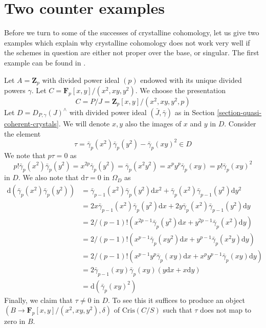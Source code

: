 \section{Two counter examples}
\label{section-examples}

\noindent
Before we turn to some of the successes of crystalline cohomology,
let us give two examples which explain why crystalline cohomology
does not work very well if the schemes in question are either not
proper over the base, or singular. The first example can be found
in \cite{BO}.

\begin{example}
\label{example-torsion}
Let $A = \mathbf{Z}_p$ with divided power ideal $(p)$ endowed with
its unique divided powers $\gamma$. Let
$C = \mathbf{F}_p[x, y]/(x^2, xy, y^2)$. We choose the presentation
$$
C = P/J = \mathbf{Z}_p[x, y]/(x^2, xy, y^2, p)
$$
Let $D = D_{P, \gamma}(J)^\wedge$ with divided power ideal
$(\bar J, \bar \gamma)$ as in Section \ref{section-quasi-coherent-crystals}.
We will denote $x, y$ also the images of $x$ and $y$ in $D$.
Consider the element
$$
\tau = \bar\gamma_p(x^2)\bar\gamma_p(y^2) - \bar\gamma_p(xy)^2 \in D
$$
We note that $p\tau = 0$ as
$$
p! \bar\gamma_p(x^2) \bar\gamma_p(y^2) =
x^{2p} \bar\gamma_p(y^2) = \bar\gamma_p(x^2y^2) =
x^py^p \bar\gamma_p(xy) = p! \bar\gamma_p(xy)^2
$$
in $D$. We also note that $\text{d}\tau = 0$ in $\Omega_D$ as
\begin{align*}
\text{d}(\bar\gamma_p(x^2) \bar\gamma_p(y^2))
& =
\bar\gamma_{p - 1}(x^2)\bar\gamma_p(y^2)\text{d}x^2 +
\bar\gamma_p(x^2)\bar\gamma_{p - 1}(y^2)\text{d}y^2 \\
& =
2 x \bar\gamma_{p - 1}(x^2)\bar\gamma_p(y^2)\text{d}x +
2 y \bar\gamma_p(x^2)\bar\gamma_{p - 1}(y^2)\text{d}y \\
& =
2/(p - 1)!( x^{2p - 1} \bar\gamma_p(y^2)\text{d}x +
y^{2p - 1} \bar\gamma_p(x^2)\text{d}y ) \\
& =
2/(p - 1)!
(x^{p - 1} \bar\gamma_p(xy^2)\text{d}x +
y^{p - 1} \bar\gamma_p(x^2y)\text{d}y) \\
& =
2/(p - 1)!
(x^{p - 1}y^p \bar\gamma_p(xy)\text{d}x +
x^py^{p - 1} \bar\gamma_p(xy)\text{d}y) \\
& =
2 \bar\gamma_{p - 1}(xy) \bar\gamma_p(xy)(y\text{d}x + x \text{d}y) \\
& = 
\text{d}(\bar\gamma_p(xy)^2)
\end{align*}
Finally, we claim that $\tau \not = 0$ in $D$. To see this it suffices to
produce an object $(B \to \mathbf{F}_p[x, y]/(x^2, xy, y^2), \delta)$
of $\text{Cris}(C/S)$ such that $\tau$ does not map to zero in $B$.

\end{example}
